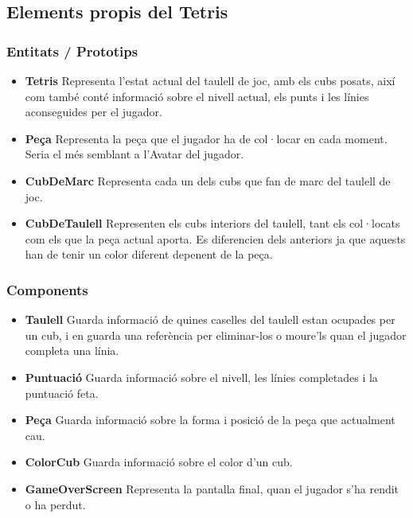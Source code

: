   \subsection{Elements propis del Tetris}

    \subsubsection{Entitats / Prototips}

      \begin{itemize}
        \item {\bf Tetris}
          Representa l'estat actual del taulell de joc, amb els cubs posats, així com també conté informació sobre el nivell actual, els punts i les línies aconseguides per el jugador.
          
        \item {\bf Peça}
          Representa la peça que el jugador ha de col·locar en cada moment. Seria el més semblant a l'Avatar del jugador.
          
        \item {\bf CubDeMarc}
          Representa cada un dels cubs que fan de marc del taulell de joc.
          
        \item {\bf CubDeTaulell}
          Representen els cubs interiors del taulell, tant els col·locats com els que la peça actual aporta. Es diferencien dels anteriors ja que aquests han de tenir un color diferent depenent de la peça.
          
      \end{itemize}

    \subsubsection{Components}

      \begin{itemize}
        \item {\bf Taulell}
          Guarda informació de quines caselles del taulell estan ocupades per un cub, i en guarda una referència per eliminar-los o moure'ls quan el jugador completa una línia.
          
        \item {\bf Puntuació}
          Guarda informació sobre el nivell, les línies completades i la puntuació feta.
          
        \item {\bf Peça}
          Guarda informació sobre la forma i posició de la peça que actualment cau.
          
        \item {\bf ColorCub}
          Guarda informació sobre el color d'un cub.
          
        \item {\bf GameOverScreen}
          Representa la pantalla final, quan el jugador s'ha rendit o ha perdut.
          
      \end{itemize}

